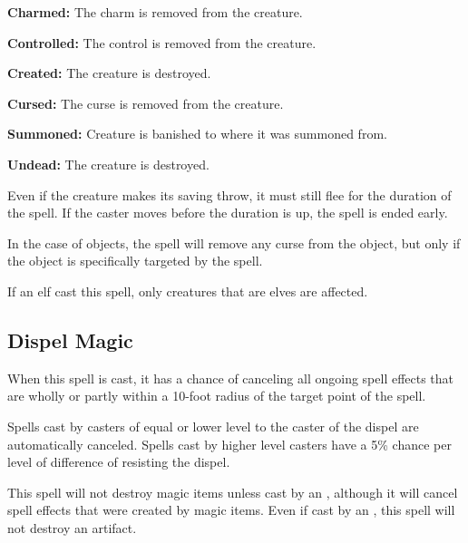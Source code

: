 \begin{multicols*}{2}
\textbf{Charmed:} The charm is removed from the creature.

\textbf{Controlled:} The control is removed from the creature.

\textbf{Created:} The creature is destroyed.

\textbf{Cursed:} The curse is removed from the creature.

\textbf{Summoned:} Creature is banished to where it was summoned from.

\textbf{Undead:} The creature is destroyed.

Even if the creature makes its saving throw, it must still flee for the duration of the spell. If the caster moves before the duration is up, the spell is ended early.

In the case of objects, the spell will remove any curse from the object, but only if the object is specifically targeted by the spell.

If an elf cast this spell, only creatures that are elves are affected.

\subsection{Dispel Magic}\label{spell:Dispel Magic}

When this spell is cast, it has a chance of canceling all ongoing spell effects that are wholly or partly within a 10-foot radius of the target point of the spell.

Spells cast by casters of equal or lower level to the caster of the dispel are automatically canceled. Spells cast by higher level casters have a 5\% chance per level of difference of resisting the dispel.


This spell will not destroy magic items unless cast by an , although it will cancel spell effects that were created by magic items. Even if cast by an , this spell will not destroy an artifact.


\end{multicols*}
